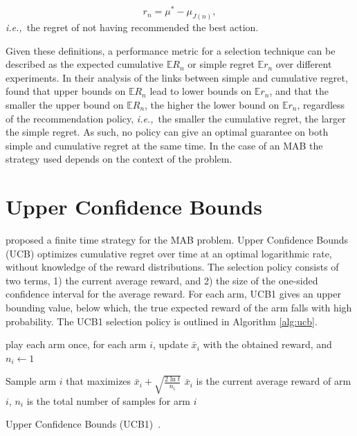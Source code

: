 \documentclass{kecsmstr}
\newcommand{\bE}{\mathbb{E}}
\newcommand{\ie}{{\it i.e.,}~}
\begin{document}
\begin{equation}
r_n = \mu^* - \mu_{J(n)},
\end{equation}
\ie the regret of not having recommended the best action.

Given these definitions, a performance metric for a selection technique can be described as the expected cumulative $\bE R_n$ or simple regret $\bE r_n$ over different experiments. In their analysis of the links between simple and cumulative regret,~ found that upper bounds on $\bE R_n$ lead to lower bounds on $\bE r_n$, and that the smaller the upper bound on $\bE R_n$, the higher the lower bound on $\bE r_n$, regardless of the recommendation policy, \ie the smaller the cumulative regret, the larger the simple regret. As such, no policy can give an optimal guarantee on both simple and cumulative regret at the same time. In the case of an MAB the strategy used depends on the context of the problem.

\section{Upper Confidence Bounds}
\label{sec:ucb}

 proposed a finite time strategy for the MAB problem. Upper Confidence Bounds (UCB) optimizes cumulative regret over time at an optimal logarithmic rate, without knowledge of the reward distributions. The selection policy consists of two terms, 1) the current average reward, and 2) the size of the one-sided confidence interval for the average reward. For each arm, UCB1 gives an upper bounding value, below which, the true expected reward of the arm falls with high probability. The UCB1 selection policy is outlined in Algorithm \ref{alg:ucb}.

\IncMargin{1em}
\begin{algorithm2e}[ht]
	\Indm
	\vspace{0.2cm}
	\Indp

	play each arm once, for each arm $i$, update $\bar{x}_i$ with the obtained reward, and $n_i \gets 1$\;

	 {
		Sample arm $i$ that maximizes $\bar{x}_i + \displaystyle\sqrt{\frac{2\ln{t}}{n_i}}$ \newline
		$\bar{x}_i$ is the current average reward of arm $i$, $n_i$ is the total number of samples for arm $i$ \;
	}

  \caption[Upper Confidence Bounds (UCB1)]{Upper Confidence Bounds (UCB1)~\protect{}. \label{alg:ucb}}
\end{algorithm2e}
\DecMargin{1em}
\end{document}
